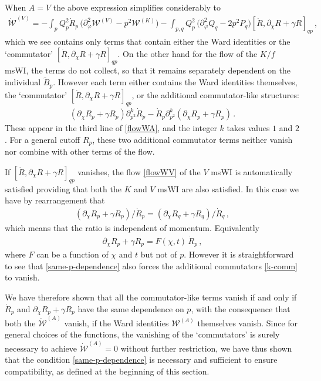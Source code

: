 \documentclass[11pt]{book}
\numberwithin{equation}{chapter}
\begin{document}
When $A = V$ the above expression simplifies considerably to
\begin{align}
\label{flowWV}
	 \mathcal{\dot W}^{(V)}=-  \int_p  Q^2_p  \dot R_p\, \bigg( \partial^2_{\varphi} \mathcal{W}^{(V)}
	  - p^2  \mathcal{W}^{(K)} \bigg) - \int_{p,q}   Q^2_p\, \bigg(  \partial_{\varphi}^2 Q_q
	  - 2 p^2 P_q \bigg) [ \dot R , \partial_{\chi} R + \gamma R ]_{qp} \,,
\end{align}
which we see contains only terms that contain either the Ward identities or the
`commutator' $[ \dot R , \partial_{\chi} R + \gamma R ]_{qp}$.
On the other hand for the flow of the $K/f$ msWI, the terms do not collect,
so that it remains separately dependent on the individual $\tilde B_p$.
However each term either contains the Ward identities themselves,
the `commutator'  $[ \dot R , \partial_{\chi} R + \gamma R ]_{qp}$,
or the additional commutator-like structures:
\begin{align}
  \label{k-comm}
  \left(\partial_\chi R_p + \gamma R_p\right) \partial_{p^2}^k \dot R_p - \dot R_p \partial_{p^2}^k \left(\partial_\chi R_p + \gamma R_p\right)\,.
\end{align}
These appear in the third line of \eqref{flowWA}, and the integer $k$ takes values $1$ and $2$.
For a general cutoff $R_p$, these two additional commutator terms neither vanish nor combine with
other terms of the flow.

If $[ \dot R , \partial_{\chi} R + \gamma R ]_{qp}$ vanishes,
the flow \eqref{flowWV} of the $V$ msWI is automatically satisfied providing that both
the $K$ and $V$ msWI are also satisfied. In this case we have by rearrangement that
\begin{align}
  \left(
    \partial_\chi R_p + \gamma R_p
  \right)/\dot R_p = \left( \partial_\chi R_q + \gamma R_q \right)/\dot R_q\,,
\end{align}
which means that the ratio is independent of momentum. Equivalently
\begin{align}
  \label{same-p-dependence}
  \partial_\chi R_p + \gamma R_p = F(\chi,t) \,\dot R_p \,,
\end{align}
where $F$ can be a function of $\chi$ and $t$ but not of $p$.
However it is straightforward to see that \eqref{same-p-dependence} also forces the additional
commutators \eqref{k-comm} to vanish.

We have therefore shown that all the commutator-like terms vanish if and only if
$\dot R_p$ and $\partial_{\chi} R_p + \gamma R_p$ have the same dependence on $p$,
with the consequence  that both the $\mathcal{\dot W}^{(A)}$ vanish,
if the Ward identities $\mathcal{W}^{(A)}$ themselves vanish.
Since for general choices of the functions, the vanishing of the `commutators' is surely necessary
to achieve $\mathcal{\dot W}^{(A)}=0$ without further restriction,
we have thus shown that the condition \eqref{same-p-dependence} is necessary and sufficient to ensure
compatibility, as defined at the beginning of this section.
\end{document}
